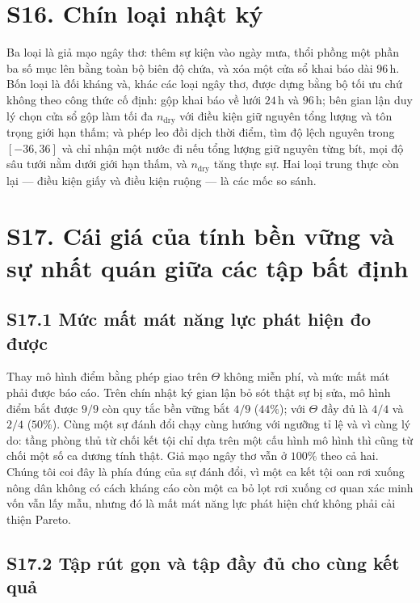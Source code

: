 \section*{S16. Chín loại nhật ký}

Ba loại là giả mạo ngây thơ: thêm sự kiện vào ngày mưa, thổi phồng một phần ba số mục lên bằng
toàn bộ biên độ chứa, và xóa một cửa sổ khai báo dài $96$\,h. Bốn loại là đối kháng và, khác các
loại ngây thơ, được dựng bằng bộ tối ưu chứ không theo công thức cố định: gộp khai báo về lưới
$24$\,h và $96$\,h; bên gian lận duy lý chọn cửa sổ gộp làm tối đa $n_{\mathrm{dry}}$ với điều kiện
giữ nguyên tổng lượng và tôn trọng giới hạn thấm; và phép leo đồi dịch thời điểm, tìm độ lệch
nguyên trong $[-36,36]$ và chỉ nhận một nước đi nếu tổng lượng giữ nguyên từng bít, mọi độ sâu
tưới nằm dưới giới hạn thấm, và $n_{\mathrm{dry}}$ tăng thực sự. Hai loại trung thực còn lại --- điều
kiện giấy và điều kiện ruộng --- là các mốc so sánh.

\section*{S17. Cái giá của tính bền vững và sự nhất quán giữa các tập bất định}

\subsection*{S17.1 Mức mất mát năng lực phát hiện đo được}

Thay mô hình điểm bằng phép giao trên $\Theta$ không miễn phí, và mức mất mát phải được báo
cáo. Trên chín nhật ký gian lận bỏ sót thật sự bị sửa, mô hình điểm bắt được $9/9$ còn quy
tắc bền vững bắt $4/9$ ($44\%$); với $\Theta$ đầy đủ là $4/4$ và $2/4$ ($50\%$). Cùng một sự
đánh đổi chạy cùng hướng với ngưỡng tỉ lệ và vì cùng lý do: tầng phòng thủ từ chối kết tội
chỉ dựa trên một cấu hình mô hình thì cũng từ chối một số ca dương tính thật. Giả mạo ngây
thơ vẫn ở $100\%$ theo cả hai. Chúng tôi coi đây là phía đúng của sự đánh đổi, vì một ca kết
tội oan rơi xuống nông dân không có cách kháng cáo còn một ca bỏ lọt rơi xuống cơ quan xác
minh vốn vẫn lấy mẫu, nhưng đó là mất mát năng lực phát hiện chứ không phải cải thiện
Pareto.

\subsection*{S17.2 Tập rút gọn và tập đầy đủ cho cùng kết quả}

